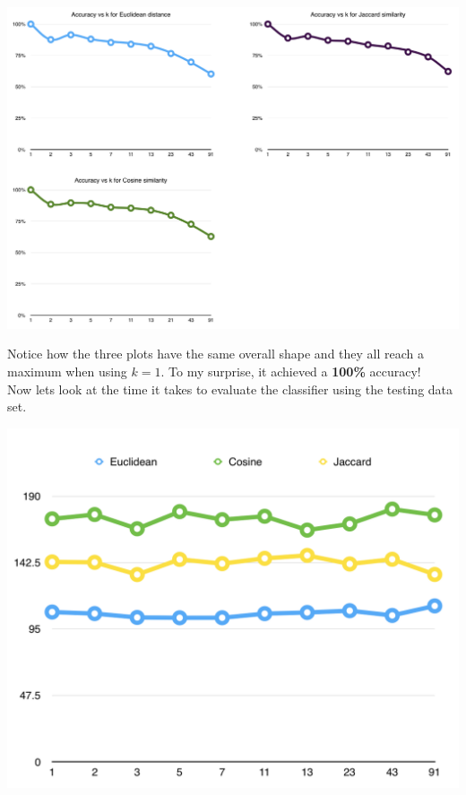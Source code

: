 \documentclass[11pt]{article}
\begin{document}
\begin{center}
\includegraphics[scale=0.4]{part1.2/acc-vs-k.png}
\end{center}

Notice how the three plots have the same overall shape and they all reach a maximum when using $k=1$. To my surprise, it achieved a \textbf{100\%} accuracy!\\

Now lets look at the time it takes to evaluate the classifier using the testing data set.

\begin{center}
\includegraphics[scale=0.65]{part1.2/test-time.png}
\end{center}
\end{document}
